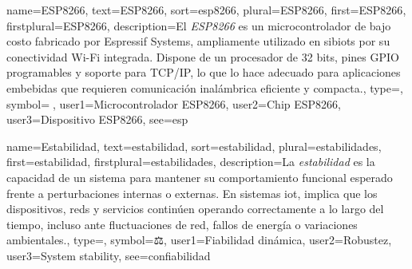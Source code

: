 	{
		name={ESP8266},
		text={ESP8266},
		sort={esp8266},
		plural={ESP8266},
		first={ESP8266},
		firstplural={ESP8266},
		description={El \emph{ESP8266} es un \gls{microcontrolador} de bajo costo fabricado por Espressif Systems, ampliamente utilizado en \glspl{sibiot} por su conectividad Wi-Fi integrada. Dispone de un procesador de 32 bits, pines GPIO programables y soporte para TCP/IP, lo que lo hace adecuado para aplicaciones embebidas que requieren comunicaci{\'o}n inal{\'a}mbrica eficiente y compacta.},
		type=\glsdefaulttype,
		symbol={📡},
		user1={Microcontrolador ESP8266},
		user2={Chip ESP8266},
		user3={Dispositivo ESP8266},
		see={esp}
	}
	
	
	{
		name={Estabilidad},
		text={estabilidad},
		sort={estabilidad},
		plural={estabilidades},
		first={estabilidad},
		firstplural={estabilidades},
		description={La \emph{estabilidad} es la capacidad de un \gls{sistema} para mantener su comportamiento funcional esperado frente a perturbaciones internas o externas. En sistemas \gls{iot}, implica que los \glspl{dispositivo}, \glspl{red} y servicios contin{\'u}en operando correctamente a lo largo del tiempo, incluso ante fluctuaciones de red, fallos de energ{\'i}a o variaciones ambientales.},
		type=\glsdefaulttype,
		symbol={⚖️},
		user1={Fiabilidad din{\'a}mica},
		user2={Robustez},
		user3={System stability},
		see={confiabilidad}
	}
	
